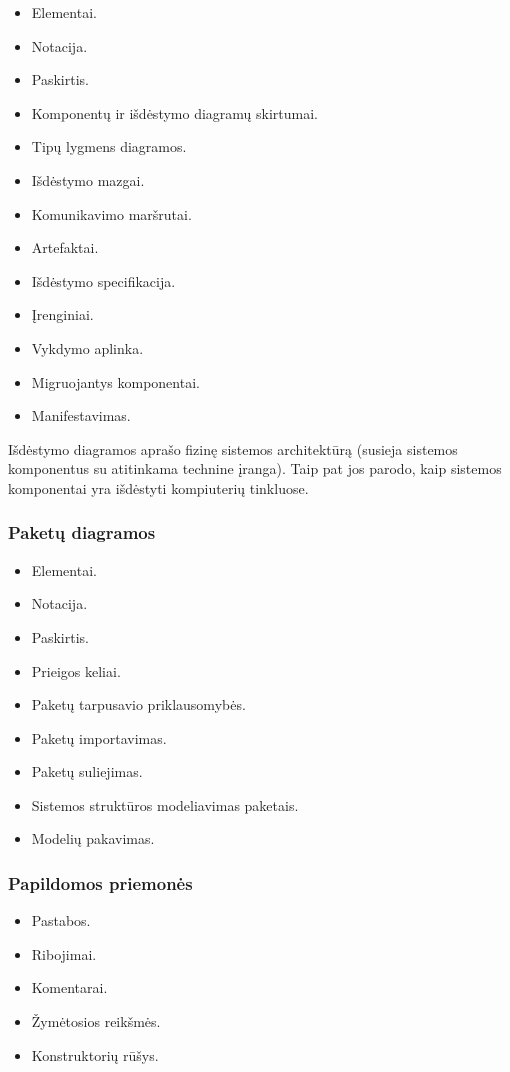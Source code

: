 \begin{itemize}
  \item Elementai.
  \item Notacija.
  \item Paskirtis.
  \item Komponentų ir išdėstymo diagramų skirtumai.
  \item Tipų lygmens diagramos.
  \item Išdėstymo mazgai.
  \item Komunikavimo maršrutai.
  \item Artefaktai.
  \item Išdėstymo specifikacija.
  \item Įrenginiai.
  \item Vykdymo aplinka.
  \item Migruojantys komponentai.
  \item Manifestavimas.
\end{itemize}

Išdėstymo diagramos aprašo fizinę sistemos architektūrą (susieja sistemos
komponentus su atitinkama technine įranga). Taip pat jos parodo, kaip
sistemos komponentai yra išdėstyti kompiuterių tinkluose.



\subsubsection{Paketų diagramos}

\begin{itemize}
  \item Elementai.
  \item Notacija.
  \item Paskirtis.
  \item Prieigos keliai.
  \item Paketų tarpusavio priklausomybės.
  \item Paketų importavimas.
  \item Paketų suliejimas.
  \item Sistemos struktūros modeliavimas paketais.
  \item Modelių pakavimas.
\end{itemize}



\subsubsection{Papildomos priemonės}

\begin{itemize}
  \item Pastabos.
  \item Ribojimai.
  \item Komentarai.
  \item Žymėtosios reikšmės.
  \item Konstruktorių rūšys.
\end{itemize}

